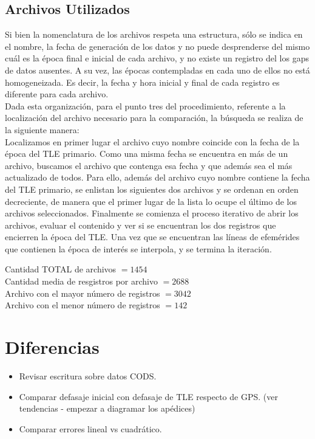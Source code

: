 \subsection*{Archivos Utilizados}
Si bien la nomenclatura de los archivos respeta una estructura, s\'olo se indica en el nombre, la fecha de generaci\'on de los datos y no puede desprenderse del mismo cu\'al es la \'epoca final e inicial de cada archivo, y no existe un registro del los gaps de datos ausentes. A su vez, las \'epocas contempladas en cada uno de ellos no está homogeneizada. Es decir, la fecha y hora inicial y final de cada registro es diferente para cada archivo.\\
Dada esta organizaci\'on, para el punto tres del procedimiento, referente a la localizaci\'on del archivo necesario para la comparaci\'on, la b\'usqueda se realiza de la siguiente manera:\\
Localizamos en primer lugar el archivo cuyo nombre coincide con la fecha de la \'epoca del TLE primario.
Como una misma fecha se encuentra en m\'as de un archivo, buscamos el archivo que contenga esa fecha y que adem\'as sea el m\'as actualizado de todos. Para ello, además del archivo cuyo nombre contiene la fecha del TLE primario, se enlistan los siguientes dos archivos y se ordenan en orden decreciente, de manera que el primer lugar de la lista lo ocupe el \'ultimo de los archivos seleccionados. Finalmente se comienza el proceso iterativo de abrir los archivos, evaluar el contenido y ver si se encuentran los dos registros que encierren la \'epoca del TLE.
Una vez que se encuentran las l\'ineas de efem\'erides que contienen la \'epoca de inter\'es se interpola, y se termina la iteraci\'on.

\noindent
Cantidad TOTAL de archivos $=  1454$\\
Cantidad media de resgistros por archivo $=  2688$\\
Archivo con el mayor n\'umero de registros $=  3042$\\
Archivo con el menor n\'umero de registros $=  142$\\


\section*{Diferencias}

\begin{itemize}
 \item Revisar escritura sobre datos CODS.
 \item Comparar defasaje inicial con defasaje de TLE respecto de GPS. (ver tendencias - empezar a diagramar los apédices)
 \item Comparar errores lineal vs cuadr\'atico.
\end{itemize}
